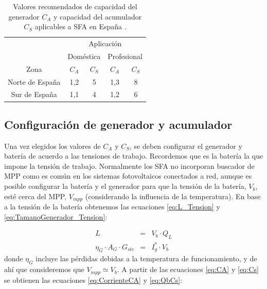 %
\begin{table}
\caption[Valores recomendados de capacidad del generador y capacidad del acumulador
aplicables a SFA en España.]{Valores recomendados de capacidad del generador $C_{A}$ y capacidad
del acumulador $C_{S}$ aplicables a SFA en España \citep{Lorenzo2006c}.\label{tab:ValoresCACSEspana}}


\centering{}\begin{tabular}{ccccc}
\toprule 
 & \multicolumn{4}{c}{Aplicación}\tabularnewline
\cmidrule{2-5} 
 & \multicolumn{2}{c}{Doméstica} & \multicolumn{2}{c}{Profesional}\tabularnewline
\midrule
\midrule 
Zona & $C_{A}$ & $C_{S}$ & $C_{A}$ & $C_{S}$\tabularnewline
\midrule 
Norte de España & 1,2 & 5 & 1,3 & 8\tabularnewline
\midrule 
Sur de España & 1,1 & 4 & 1,2 & 6\tabularnewline
\bottomrule
\end{tabular}
\end{table}



\subsection{Configuración de generador y acumulador}

Una vez elegidos los valores de $C_{A}$ y $C_{S}$, se deben configurar
el generador y batería de acuerdo a las tensiones de trabajo. Recordemos
que es la batería la que impone la tensión de trabajo. Normalmente
los SFA no incorporan buscador de MPP como es común en los sistemas
fotovoltaicos conectados a red, aunque es posible configurar la batería
y el generador para que la tensión de la batería, $V_{b}$, esté cerca
del MPP, $V_{mpp}$ (considerando la influencia de la temperatura).
En base a la tensión de la batería obtenemos las ecuaciones \ref{eq:L_Tension}
y \ref{eq:TamanoGenerador_Tension}:

\begin{eqnarray}
L & = & V_{b}\cdot Q_{L}\label{eq:L_Tension}\\
\eta_{G}\cdot A_{G}\cdot G_{stc} & = & I_{g}^{*}\cdot V_{b}\label{eq:TamanoGenerador_Tension}\end{eqnarray}
donde $\eta_{G}$ incluye las pérdidas debidas a la temperatura de
funcionamiento, y de ahí que consideremos que $V_{mpp}\simeq V_{b}$.
A partir de las ecuaciones \ref{eq:CA} y \ref{eq:Cs} se obtienen
las ecuaciones \ref{eq:CorrienteCA} y \ref{eq:QbCs}: 

